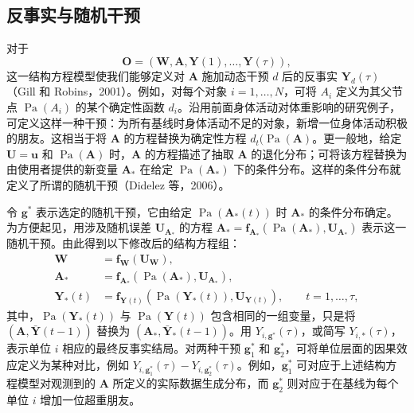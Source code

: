 \subsection{反事实与随机干预}

对于
\[
 \mathbf O=(\mathbf W,\mathbf A,\mathbf Y(1),\ldots,\mathbf Y(\tau)),
\]
这一结构方程模型使我们能够定义对 $\mathbf A$ 施加动态干预 $d$ 后的反事实 $\mathbf Y_d(\tau)$（Gill 和 Robins，2001）。例如，对每个对象 $i=1,\ldots,N$，可将 $A_i$ 定义为其父节点 $\operatorname{Pa}(A_i)$ 的某个确定性函数 $d_i$。沿用前面身体活动对体重影响的研究例子，可定义这样一种干预：为所有基线时身体活动不足的对象，新增一位身体活动积极的朋友。这相当于将 $\mathbf A$ 的方程替换为确定性方程 $d_t(\operatorname{Pa}(\mathbf A)$。更一般地，给定 $\mathbf U=\mathbf u$ 和 $\operatorname{Pa}(\mathbf A)$ 时，$\mathbf A$ 的方程描述了抽取 $\mathbf A$ 的退化分布；可将该方程替换为由使用者提供的新变量 $\mathbf A_*$ 在给定 $\operatorname{Pa}(\mathbf A_*)$ 下的条件分布。这样的条件分布就定义了所谓的随机干预（Didelez 等，2006）。

令 $\mathbf g^*$ 表示选定的随机干预，它由给定 $\operatorname{Pa}(\mathbf A_*(t))$ 时 $\mathbf A_*$ 的条件分布确定。为方便起见，用涉及随机误差 $\mathbf U_{\mathbf A_*}$ 的方程 $\mathbf A_*=\mathbf f_{\mathbf A_*}(\operatorname{Pa}(\mathbf A_*),\mathbf U_{\mathbf A_*})$ 表示这一随机干预。由此得到以下修改后的结构方程组：
\begin{equation}
\begin{aligned}
 \mathbf W&=\mathbf f_{\mathbf W}(\mathbf U_{\mathbf W}),\\
 \mathbf A_*&=\mathbf f_{\mathbf A_*}(\operatorname{Pa}(\mathbf A_*),\mathbf U_{\mathbf A_*}),\\
 \mathbf Y_*(t)&=\mathbf f_{\mathbf Y(t)}(\operatorname{Pa}(\mathbf Y_*(t)),\mathbf U_{\mathbf Y(t)}),
 \qquad t=1,\ldots,\tau,
\end{aligned}
\tag{20.3}
\end{equation}
其中，$\operatorname{Pa}(\mathbf Y_*(t))$ 与 $\operatorname{Pa}(\mathbf Y(t))$ 包含相同的一组变量，只是将 $(\mathbf A,\bar{\mathbf Y}(t-1))$ 替换为 $(\mathbf A_*,\bar{\mathbf Y}_*(t-1))$。用 $Y_{i,\mathbf g^*}(\tau)$，或简写 $Y_{i,*}(\tau)$，表示单位 $i$ 相应的最终反事实结局。对两种干预 $\mathbf g_1^*$ 和 $\mathbf g_2^*$，可将单位层面的因果效应定义为某种对比，例如 $Y_{i,\mathbf g_1^*}(\tau)-Y_{i,\mathbf g_2^*}(\tau)$。例如，$\mathbf g_1^*$ 可对应于上述结构方程模型对观测到的 $\mathbf A$ 所定义的实际数据生成分布，而 $\mathbf g_2^*$ 则对应于在基线为每个单位 $i$ 增加一位超重朋友。

